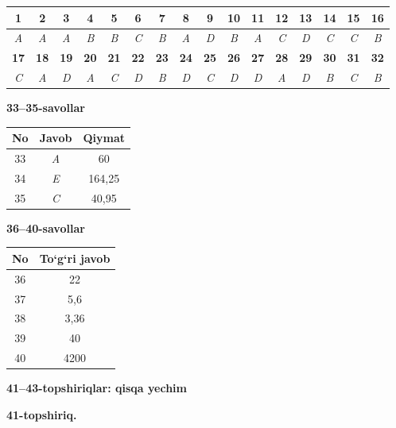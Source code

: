 \documentclass[11pt,a4paper]{article}
\begin{document}
\noindent\begin{tabular}{|c|c|c|c|c|c|c|c|c|c|c|c|c|c|c|c|}\hline
\textbf{1} & \textbf{2} & \textbf{3} & \textbf{4} & \textbf{5} & \textbf{6} & \textbf{7} & \textbf{8} & \textbf{9} & \textbf{10} & \textbf{11} & \textbf{12} & \textbf{13} & \textbf{14} & \textbf{15} & \textbf{16}\\\hline
\textsl{A} & \textsl{A} & \textsl{A} & \textsl{B} & \textsl{B} & \textsl{C} & \textsl{B} & \textsl{A} & \textsl{D} & \textsl{B} & \textsl{A} & \textsl{C} & \textsl{D} & \textsl{C} & \textsl{C} & \textsl{B}\\\hline
\textbf{17} & \textbf{18} & \textbf{19} & \textbf{20} & \textbf{21} & \textbf{22} & \textbf{23} & \textbf{24} & \textbf{25} & \textbf{26} & \textbf{27} & \textbf{28} & \textbf{29} & \textbf{30} & \textbf{31} & \textbf{32}\\\hline
\textsl{C} & \textsl{A} & \textsl{D} & \textsl{A} & \textsl{C} & \textsl{D} & \textsl{B} & \textsl{D} & \textsl{C} & \textsl{D} & \textsl{D} & \textsl{A} & \textsl{D} & \textsl{B} & \textsl{C} & \textsl{B}\\\hline
\end{tabular}\par\medskip
\noindent\textbf{33--35-savollar}\par\smallskip
\noindent\begin{tabular}{|c|c|c|}\hline \textbf{No} & \textbf{Javob} & \textbf{Qiymat}\\\hline
33 & \textsl{A} & 60\\\hline
34 & \textsl{E} & 164,25\\\hline
35 & \textsl{C} & 40,95\\\hline
\end{tabular}\par\medskip
\noindent\textbf{36--40-savollar}\par\smallskip
\noindent\begin{tabular}{|c|c|}\hline \textbf{No} & \textbf{To`g`ri javob}\\\hline
36 & 22\\\hline
37 & 5,6\\\hline
38 & 3,36\\\hline
39 & 40\\\hline
40 & 4200\\\hline
\end{tabular}\par\medskip
\noindent\textbf{41--43-topshiriqlar: qisqa yechim}\par\smallskip
\noindent\textbf{41-topshiriq.}\par
\end{document}
